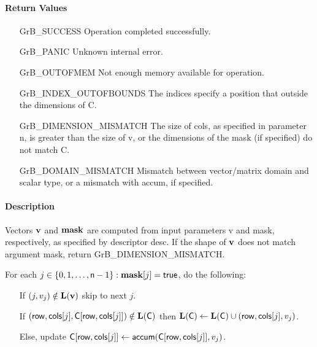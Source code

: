 \paragraph{Return Values}

\begin{itemize}[leftmargin=2.1in]
\item[{\sf GrB\_SUCCESS}]             Operation completed successfully.
\item[{\sf GrB\_PANIC}]               Unknown internal error.
\item[{\sf GrB\_OUTOFMEM}]            Not enough memory available for operation.
\item[{\sf GrB\_INDEX\_OUTOFBOUNDS}]  The indices specify a position that outside the dimensions of {\sf C}.
\item[{\sf GrB\_DIMENSION\_MISMATCH}] 
        The size of {\sf cols}, as specified in parameter {\sf n}, is greater than the size of {\sf v}, or
        the dimensions of the mask (if specified) do not match {\sf C}.
\item[{\sf GrB\_DOMAIN\_MISMATCH}]    Mismatch between vector/matrix domain and scalar type,
                                      or a mismatch with {\sf accum}, if specified.
\end{itemize}

\paragraph{Description}

Vectors ${\bf v}$ and ${\bf mask}$ are computed from input parameters {\sf v} and {\sf mask}, respectively,
as specified by descriptor {\sf desc}. If the shape of ${\bf v}$ does not match argument {\sf mask},
return {\sf GrB\_DIMENSION\_MISMATCH}.

For each $j \in \{0, 1, \ldots, {\sf n}-1 \} : {\bf mask}[j] = {\sf true}$, do the following:
\begin{itemize}
	\item[] If $(j,v_{j}) \notin \bold{L}({\bf v})$ skip to next $j$.
	\item[] If $({\sf row}, {\sf cols}[j], {\sf C}[{\sf row},{\sf cols}[j]]) \notin \bold{L}({\sf C})$ then
	      $\bold{L}({\sf C}) \leftarrow \bold{L}({\sf C}) \cup ({\sf row},{\sf cols}[j],v_{j})$.
	\item[]  Else, update ${\sf C}[{\sf row},{\sf cols}[j]] \leftarrow {\sf accum}({\sf C}[{\sf row},{\sf cols}[j]],v_{j})$.
\end{itemize}


